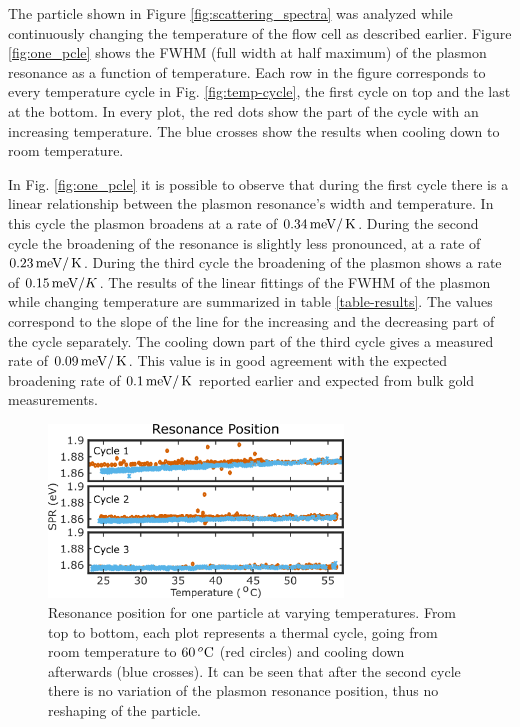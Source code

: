 The particle shown in Figure \ref{fig:scattering_spectra} was analyzed while
continuously changing the temperature of the flow cell as described earlier.
Figure \ref{fig:one_pcle} shows the FWHM (full width at half maximum) of the
plasmon resonance as a function of temperature. Each row in the figure
corresponds to every temperature cycle in Fig. \ref{fig:temp-cycle}, the first
cycle on top and the last at the bottom. In every plot, the red dots show the
part of the cycle with an increasing temperature. The blue crosses show the
results when cooling down to room temperature.

In Fig. \ref{fig:one_pcle} it is possible to observe that during the first cycle
there is a linear relationship between the plasmon resonance's width and
temperature. In this cycle the plasmon broadens at a rate of $0.34\,\textrm{meV}/\,\textrm{K}$.
During the second cycle the broadening of the resonance is slightly less
pronounced, at a rate of $0.23\,\textrm{meV}/\,\textrm{K}$. During the third cycle the broadening of
the plasmon shows a rate of $0.15\,\textrm{meV}/K$. The results of the linear fittings of
the FWHM of the plasmon while changing temperature are summarized in table
\ref{table-results}. The values correspond to the slope of the line for the
increasing and the decreasing part of the cycle separately. The cooling down
part of the third cycle gives a measured rate of $0.09\,\textrm{meV}/\,\textrm{K}$. This value is in
good agreement with the expected broadening rate of $0.1\,\textrm{meV}/\,\textrm{K}$ reported
earlier\cite{Liu2009b,Konrad2013} and expected from bulk gold measurements.

\begin{figure}[tp] \centering
\includegraphics[width=78.2mm]{Chapters/05_WhiteLight/Figures/02_One_Pcle/02_One_Pcle_02.png}
\caption{Resonance position for one particle at varying temperatures. From top
to bottom, each plot represents a thermal cycle, going from room temperature to
$60\,^o\textrm{C}$ (red circles) and cooling down afterwards (blue crosses). It can be
seen that after the second cycle there is no variation of the plasmon resonance
position, thus no reshaping of the particle.}
	\label{fig:one_pcle_spr}
\end{figure}

